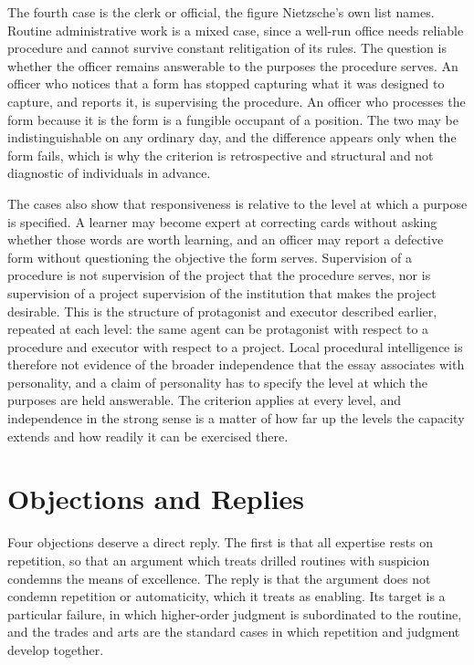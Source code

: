 \documentclass[11pt]{article}
\begin{document}
The fourth case is the clerk or official, the figure Nietzsche's own list names. Routine administrative work is a mixed case, since a well-run office needs reliable procedure and cannot survive constant relitigation of its rules. The question is whether the officer remains answerable to the purposes the procedure serves. An officer who notices that a form has stopped capturing what it was designed to capture, and reports it, is supervising the procedure. An officer who processes the form because it is the form is a fungible occupant of a position. The two may be indistinguishable on any ordinary day, and the difference appears only when the form fails, which is why the criterion is retrospective and structural and not diagnostic of individuals in advance.

The cases also show that responsiveness is relative to the level at which a purpose is specified. A learner may become expert at correcting cards without asking whether those words are worth learning, and an officer may report a defective form without questioning the objective the form serves. Supervision of a procedure is not supervision of the project that the procedure serves, nor is supervision of a project supervision of the institution that makes the project desirable. This is the structure of protagonist and executor described earlier, repeated at each level: the same agent can be protagonist with respect to a procedure and executor with respect to a project. Local procedural intelligence is therefore not evidence of the broader independence that the essay associates with personality, and a claim of personality has to specify the level at which the purposes are held answerable. The criterion applies at every level, and independence in the strong sense is a matter of how far up the levels the capacity extends and how readily it can be exercised there.

\section{Objections and Replies}

Four objections deserve a direct reply. The first is that all expertise rests on repetition, so that an argument which treats drilled routines with suspicion condemns the means of excellence. The reply is that the argument does not condemn repetition or automaticity, which it treats as enabling. Its target is a particular failure, in which higher-order judgment is subordinated to the routine, and the trades and arts are the standard cases in which repetition and judgment develop together.
\end{document}
